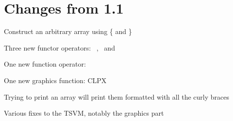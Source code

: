 \section{Changes from 1.1}

\begin{itemlist}
\item Construct an arbitrary array using \{ and \}
\item Three new functor operators: \basicinfixmap\ , \basiccurrymap\ and \basicseqapp
\item One new function operator: \basicpipe
\item One new graphics function: CLPX
\item Trying to print an array will print them formatted with all the curly braces
\item Various fixes to the TSVM, notably the graphics part
\end{itemlist}
